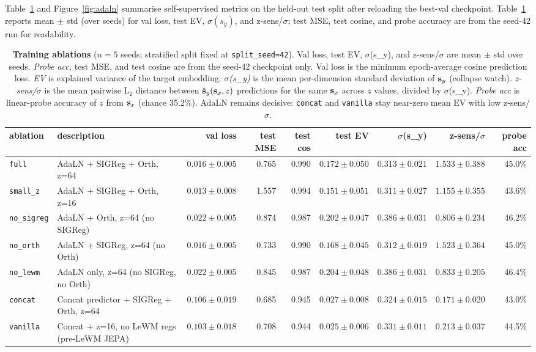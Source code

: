 Table~\ref{tab:ablation} and Figure~\ref{fig:adaln} summarise
self-supervised metrics on the held-out test split after reloading
the best-val checkpoint. Table~\ref{tab:ablation} reports mean
$\pm$ std (over seeds) for val loss, test EV, $\sigma(s_y)$, and
z-sens/$\sigma$; test MSE, test cosine, and probe accuracy are from
the seed-42 run for readability.

\begin{table}[H]
\centering
\footnotesize
\setlength{\tabcolsep}{3.5pt}
\caption{\textbf{Training ablations} ($n{=}5$ seeds; stratified split
fixed at \texttt{split\_seed=42}). Val loss, test EV, $\sigma$(s\_y),
and z-sens/$\sigma$ are mean $\pm$ std over seeds. \emph{Probe acc,}
test MSE, and test cosine are from the seed-42 checkpoint only.
Val loss is the minimum epoch-average cosine prediction loss. \emph{EV}
is explained variance of the target embedding. \emph{$\sigma$(s\_y)} is
the mean per-dimension standard deviation of $\mathbf{s}_y$ (collapse watch).
\emph{z-sens/$\sigma$} is the mean pairwise L$_2$ distance between
$\hat{\mathbf{s}}_y(\mathbf{s}_x,z)$ predictions for the same $\mathbf{s}_x$ across $z$ values,
divided by $\sigma$(s\_y). \emph{Probe acc} is linear-probe accuracy of
$z$ from $\mathbf{s}_x$ (chance 35.2\%). AdaLN remains decisive: \texttt{concat}
and \texttt{vanilla} stay near-zero mean EV with low z-sens/$\sigma$.}
\label{tab:ablation}
\begin{tabular}{llrrrrrrr}
\toprule
ablation & description & val loss & test MSE & test cos & test EV & $\sigma$(s_y) & z-sens/$\sigma$ & probe acc \\
\midrule
\texttt{full} & AdaLN + SIGReg + Orth, z=64 & $0.016 \pm 0.005$ & 0.765 & 0.990 & $0.172 \pm 0.050$ & $0.313 \pm 0.021$ & $1.533 \pm 0.388$ & 45.0\% \\
\texttt{small\_z} & AdaLN + SIGReg + Orth, z=16 & $0.013 \pm 0.008$ & 1.557 & 0.994 & $0.151 \pm 0.051$ & $0.311 \pm 0.027$ & $1.155 \pm 0.355$ & 43.6\% \\
\texttt{no\_sigreg} & AdaLN + Orth, z=64 (no SIGReg) & $0.022 \pm 0.005$ & 0.874 & 0.987 & $0.202 \pm 0.047$ & $0.386 \pm 0.031$ & $0.806 \pm 0.234$ & 46.2\% \\
\texttt{no\_orth} & AdaLN + SIGReg, z=64 (no Orth) & $0.016 \pm 0.005$ & 0.733 & 0.990 & $0.168 \pm 0.045$ & $0.312 \pm 0.019$ & $1.523 \pm 0.364$ & 45.0\% \\
\texttt{no\_lewm} & AdaLN only, z=64 (no SIGReg, no Orth) & $0.022 \pm 0.005$ & 0.845 & 0.987 & $0.204 \pm 0.048$ & $0.386 \pm 0.031$ & $0.833 \pm 0.205$ & 46.4\% \\
\texttt{concat} & Concat predictor + SIGReg + Orth, z=64 & $0.106 \pm 0.019$ & 0.685 & 0.945 & $0.027 \pm 0.008$ & $0.324 \pm 0.015$ & $0.171 \pm 0.020$ & 43.0\% \\
\texttt{vanilla} & Concat + z=16, no LeWM regs (pre-LeWM JEPA) & $0.103 \pm 0.018$ & 0.708 & 0.944 & $0.025 \pm 0.006$ & $0.331 \pm 0.011$ & $0.213 \pm 0.037$ & 44.5\% \\
\bottomrule
\end{tabular}
\end{table}

